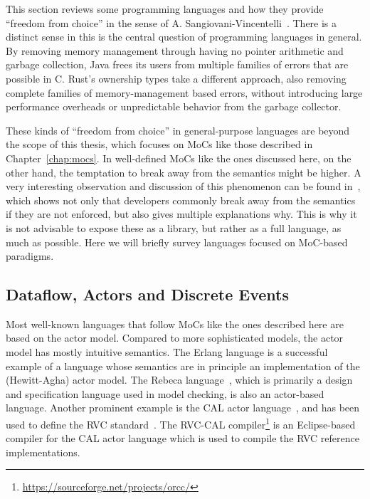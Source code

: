 This section reviews some programming languages and how they provide ``freedom from choice'' in the sense of A. Sangiovani-Vincentelli~\cite{lee2019freedom}.
There is a distinct sense in this is the central question of programming languages in general.
By removing memory management through having no pointer arithmetic and garbage collection, Java frees its users from multiple families of errors that are possible in C.
Rust's ownership types take a different approach, also removing complete families of memory-management based errors, without introducing large performance overheads or unpredictable behavior from the garbage collector.

These kinds of ``freedom from choice'' in general-purpose languages are beyond the scope of this thesis, which focuses on \acp{MoC} like those described in Chapter~\ref{chap:mocs}.
In well-defined \acp{MoC} like the ones discussed here, on the other hand, the temptation to break away from the semantics might be higher.
A very interesting observation and discussion of this phenomenon can be found in~\cite{tasharofi2013scala}, which shows not only that developers commonly break away from the semantics if they are not enforced, but also gives multiple explanations why.
This is why it is not advisable to expose these as a library, but rather as a full language, as much as possible. 
Here we will briefly survey languages focused on \ac{MoC}-based paradigms.

\subsection{Dataflow, Actors and Discrete Events}
\label{sec:general_dataflow_tools}

Most well-known languages that follow \acp{MoC} like the ones described here are based on the actor model.
Compared to more sophisticated models, the actor model has mostly intuitive semantics.
The Erlang language is a successful example of a language whose semantics are in principle an implementation of the (Hewitt-Agha) actor model.
The Rebeca language~\cite{sirjani2004formal}, which is primarily a design and specification language used in model checking, is also an actor-based language.
Another prominent example is the CAL actor language~\cite{eker2003cal}, and has been used to define the \ac{RVC} standard~\cite{bhattacharyya2011overview}.
The \ac{RVC}-CAL compiler\footnote{\url{https://sourceforge.net/projects/orcc/}} is an Eclipse-based compiler for the CAL actor language which is used to compile the \ac{RVC} reference implementations.

